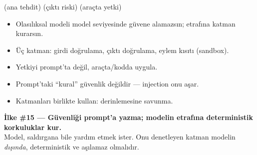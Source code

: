  (ana tehdit) \tlsep {} \tlsep {} (çıktı riski) \tlsep
{} \tlsep {} \tlsep {} (araçta yetki)

\begin{itemize}
  \item Olasılıksal modeli model seviyesinde güvene alamazsın; etrafına katman kurarsın.
  \item Üç katman: girdi doğrulama, çıktı doğrulama, eylem kısıtı (sandbox).
  \item Yetkiyi prompt'ta değil, araçta/kodda uygula.
  \item Prompt'taki ``kural'' güvenlik değildir --- injection onu aşar.
  \item Katmanları birlikte kullan: derinlemesine savunma.
\end{itemize}

\begin{principlebox}
\textbf{İlke \#15 — Güvenliği prompt'a yazma; modelin etrafına deterministik korkuluklar kur.}\\[4pt]
\normalsize Model, saldırgana bile yardım etmek ister. Onu denetleyen katman
modelin \emph{dışında}, deterministik ve aşılamaz olmalıdır.
\end{principlebox}
